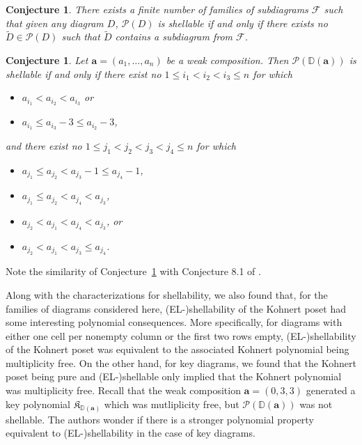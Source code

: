 \documentclass[letterpaper,10pt]{article}
\newtheorem{conj}[theorem]{Conjecture}
\begin{document}
\begin{conj}\label{conj:shell}
    There exists a finite number of families of subdiagrams $\mathcal{F}$ such that given any diagram $D$, $\mathcal{P}(D)$ is shellable if and only if there exists no $\tilde{D}\in \mathcal{P}(D)$ such that $\tilde{D}$ contains a subdiagram from $\mathcal{F}$. 
\end{conj}

\begin{conj}\label{conj:key}
    Let $\mathbf{a}=(a_1,\hdots,a_n)$ be a weak composition. Then $\mathcal{P}(\mathbb{D}(\mathbf{a}))$ is shellable if and only if there exist no $1\le i_1<i_2<i_3\le n$ for which
    \begin{itemize}
    \item $a_{i_1}<a_{i_2}<a_{i_3}$ or
    \item $a_{i_1}\le a_{i_3}-3\le a_{i_2}-3$,
    \end{itemize}
    and there exist no $1\le j_1<j_2<j_3<j_4\le n$ for which
    \begin{itemize}
    \item $a_{j_1}\le a_{j_2}<a_{j_3}-1\le a_{j_4}-1$,
    \item $a_{j_1}\le a_{j_2}<a_{j_4}< a_{j_3}$,
    \item $a_{j_2}< a_{j_1}<a_{j_4}< a_{j_3}$, or
    \item $a_{j_2}< a_{j_1}<a_{j_3}\le a_{j_4}$.
\end{itemize}
\end{conj}

\noindent
Note the similarity of Conjecture~\ref{conj:shell} with Conjecture 8.1 of \textbf{\cite{KPoset1}}. 

Along with the characterizations for shellability, we also found that, for the families of diagrams considered here, (EL-)shellability of the Kohnert poset had some interesting polynomial consequences. More specifically, for diagrams with either one cell per nonempty column or the first two rows empty, (EL-)shellability of the Kohnert poset was equivalent to the associated Kohnert polynomial being multiplicity free. On the other hand, for key diagrams, we found that the Kohnert poset being pure and (EL-)shellable only implied that the Kohnert polynomial was multiplicity free. Recall that the weak composition $\mathbf{a}=(0,3,3)$ generated a key polynomial $\mathfrak{K}_{\mathbb{D}(\mathbf{a})}$ which was mutliplicity free, but $\mathcal{P}(\mathbb{D}(\mathbf{a}))$ was not shellable. The authors wonder if there is a stronger polynomial property equivalent to (EL-)shellability in the case of key diagrams.
\end{document}
